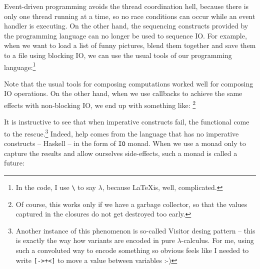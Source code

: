 Event-driven programming avoids the thread coordination hell, because there is
only one thread running at a time, so no race conditions can occur while an
event handler is executing. On the other hand, the sequencing constructs
provided by the programming language can no longer be used to sequence IO. For
example, when we want to load a list of funny pictures, blend them together and
save them to a file using blocking IO, we can use the usual tools of our
programming language:\footnote{In the code, I use \texttt{\textbackslash} to say
$\lambda$, because \LaTeX is, well, complicated.}


Note that the usual tools for composing computations worked well for composing
IO operations. On the other hand, when we use callbacks to achieve the same
effects with non-blocking IO, we end up with something like: \footnote{Of
course, this works only if we have a garbage collector, so that the values
captured in the closures do not get destroyed too early.}


It is instructive to see that when imperative constructs fail, the functional
come to the rescue.\footnote{Another instance of this phenomenon is so-called
Visitor desing pattern -- this is exactly the way how variants are encoded in
pure $\lambda$-calculus. For me, using such a convoluted way to encode something
so obvious feels like I needed to write \texttt{[->+<]} to move a value between
variables :-)} Indeed, help comes from the language that has no imperative
constructs -- Haskell -- in the form of \texttt{IO} monad. When we use a monad
only to capture the results and allow ourselves side-effects, such a monad is
called a future: 

